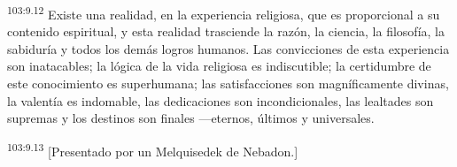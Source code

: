 \par
\textsuperscript{103:9.12} Existe una realidad, en la experiencia religiosa, que es proporcional a su contenido espiritual, y esta realidad trasciende la razón, la ciencia, la filosofía, la sabiduría y todos los demás logros humanos. Las convicciones de esta experiencia son inatacables; la lógica de la vida religiosa es indiscutible; la certidumbre de este conocimiento es superhumana; las satisfacciones son magníficamente divinas, la valentía es indomable, las dedicaciones son incondicionales, las lealtades son supremas y los destinos son finales ---eternos, últimos y universales.

\par
\textsuperscript{103:9.13} [Presentado por un Melquisedek de Nebadon.]